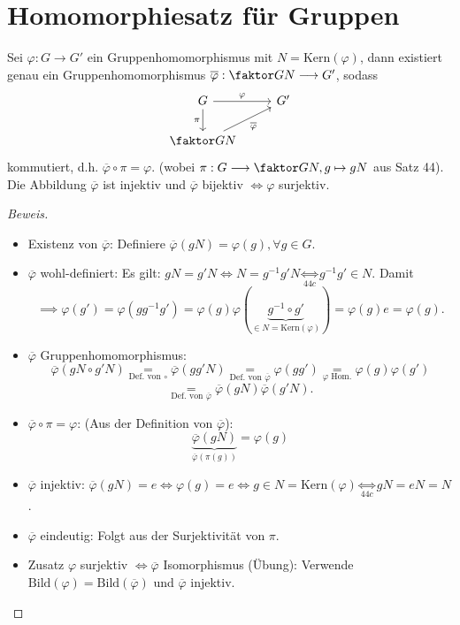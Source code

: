 \documentclass[a4paper]{report}
\begin{document}
\section{Homomorphiesatz für Gruppen}
\begin{satz}
  Sei $\varphi: G \to G'$ ein Gruppenhomomorphismus mit $N = \mathrm{Kern}(\varphi)$, dann existiert genau ein Gruppenhomomorphismus $\overline \varphi : \faktor GN \longrightarrow G'$, sodass
  $$
\begin{tikzcd}
G \arrow[r, "\varphi"] \arrow[d, "\pi"'] & G' \\
\faktor GN \arrow[ru, "\overline \varphi"']               &
\end{tikzcd}
$$
kommutiert, d.h. $\overline \varphi \circ \pi = \varphi$. (wobei $\pi : G \longrightarrow \faktor GN, g \mapsto gN$ aus Satz 44). Die Abbildung $\overline \varphi$ ist injektiv und $\overline \varphi$ bijektiv $\iff \varphi$ surjektiv.
\begin{proof}[Beweis]
\begin{itemize}
  \item Existenz von $\overline \varphi$: Definiere $\overline\varphi(gN) = \varphi(g), \forall g \in G$.
  \item $\overline\varphi$ wohl-definiert: Es gilt: $gN = g'N \iff N = g^{-1}g'N \underset{44c}\iff g^{-1}g' \in N.$ Damit $$\implies \varphi(g') = \varphi(gg^{-1}g') = \varphi(g)\varphi(\underbrace{g^{-1} \circ g'}_{\in N = \mathrm{Kern}(\varphi)}) = \varphi(g)e = \varphi(g).$$
  \item $\overline\varphi$ Gruppenhomomorphismus: $$\overline\varphi(gN \circ g'N)\underset{\text{Def. von } \circ} = \overline\varphi(gg'N) \underset{\text{Def. von } \overline\varphi} =  \varphi(gg') \underset{\varphi \text{ Hom.}} = \varphi(g)\varphi(g')$$
        $$\underset{\text{Def. von } \overline\varphi} =\overline\varphi(gN)\overline\varphi(g'N).$$
\item $\overline\varphi \circ \pi = \varphi$: (Aus der Definition von $\overline\varphi$): $$\underbrace{\overline\varphi(gN)}_{\overline\varphi(\pi(g))} = \varphi(g)$$
\item $\overline\varphi$ injektiv: $\overline\varphi(gN) = e \iff \varphi(g)=e \iff g \in N = \mathrm{Kern}(\varphi) \underset{44c} \iff gN= eN = N$.
\item $\overline\varphi$ eindeutig: Folgt aus der Surjektivität von $\pi$.
\item Zusatz $\varphi$ surjektiv $\iff \overline\varphi$ Isomorphismus (Übung): Verwende $\mathrm{Bild}(\varphi) = \mathrm{Bild}(\overline\varphi)$ und $\overline\varphi$ injektiv.
\end{itemize}
\end{proof}
\end{satz}
\end{document}
